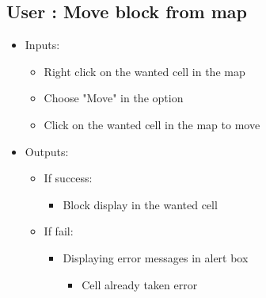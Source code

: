 \subsection{User : Move block from map}
	\begin{itemize}
	
	
		\item Inputs:
			\begin{itemize}
				\item Right click on the wanted cell in the map
				\item Choose "Move" in the option
				\item Click on the wanted cell in the map to move
			\end{itemize}
			\item Outputs:
				\begin{itemize}
					\item If success:					
					\begin{itemize}
						\item Block display in the wanted cell
					\end{itemize}
					\item If fail:
					\begin{itemize}
					\item Displaying error messages in alert box
					\begin{itemize}
						\item Cell already taken error
					\end{itemize}
					\end{itemize}
				\end{itemize}
	\end{itemize}